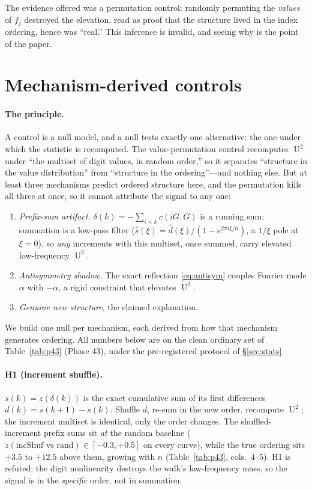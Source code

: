 \documentclass[11pt]{article}
\theoremstyle{definition}
\DeclareMathOperator{\Uk}{U}
\begin{document}
The evidence offered was a permutation control: randomly permuting the
\emph{values} of $f_j$ destroyed the elevation, read as proof that the
structure lived in the index ordering, hence was ``real.'' This inference
is invalid, and seeing why is the point of the paper.

\section{Mechanism-derived controls}\label{sec:controls}

\paragraph{The principle.} A control is a null model, and a null tests
exactly one alternative: the one under which the statistic is recomputed.
The value-permutation control recomputes $\Uk^2$ under ``the multiset of
digit values, in random order,'' so it separates ``structure in the value
distribution'' from ``structure in the ordering''---and nothing else. But
at least three mechanisms predict ordered structure here, and the
permutation kills all three at once, so it cannot attribute the signal to
any one:
\begin{enumerate}
\item[(H1)] \emph{Prefix-sum artifact.} $\delta(k)=-\sum_{i<k}c(iG,G)$ is
a running sum; summation is a low-pass filter
($\hat s(\xi)=\hat d(\xi)/(1-e^{2\pi i\xi/n})$, a $1/\xi$ pole at
$\xi=0$), so \emph{any} increments with this multiset, once summed, carry
elevated low-frequency $\Uk^2$.
\item[(H2)] \emph{Antisymmetry shadow.} The exact reflection
\eqref{eq:antisym} couples Fourier mode $\alpha$ with $-\alpha$, a rigid
constraint that elevates $\Uk^2$.
\item[(H3)] \emph{Genuine new structure}, the claimed explanation.
\end{enumerate}
We build one null per mechanism, each derived from how that mechanism
generates ordering. All numbers below are on the clean ordinary set of
Table~\ref{tab:p43} (Phase 43), under the pre-registered protocol of
\S\ref{sec:stats}.

\paragraph{H1 (increment shuffle).} $s(k)=z(\delta(k))$ is the exact
cumulative sum of its first differences $d(k)=s(k+1)-s(k)$. Shuffle $d$,
re-sum in the new order, recompute $\Uk^2$; the increment multiset is
identical, only the order changes. The shuffled-increment prefix sums sit
\emph{at} the random baseline ($z(\text{incShuf vs rand})\in[-0.3,+0.5]$
on every curve), while the true ordering sits $+3.5$ to $+12.5$ above
them, growing with $n$ (Table~\ref{tab:p43}, cols.\ 4--5). H1 is refuted:
the digit nonlinearity destroys the walk's low-frequency mass, so the
signal is in the \emph{specific} order, not in summation.
\end{document}
